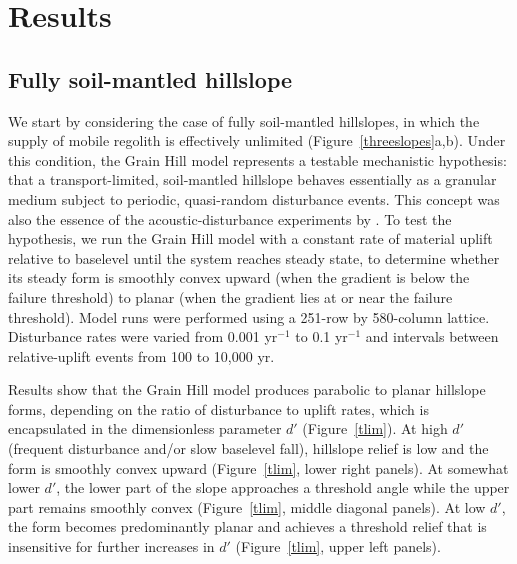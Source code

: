 \documentclass[esurf, manuscript]{copernicus}
\begin{document}
\section{Results}

\subsection{Fully soil-mantled hillslope}

We start by considering the case of fully soil-mantled hillslopes, in which the supply of mobile regolith is effectively unlimited (Figure~\ref{threeslopes}a,b). Under this condition, the Grain Hill model represents a testable mechanistic hypothesis: that a transport-limited, soil-mantled hillslope behaves essentially as a granular medium subject to periodic, quasi-random disturbance events. This concept was also the essence of the acoustic-disturbance experiments by \citet{roering2001hillslope}. To test the hypothesis, we run the Grain Hill model with a constant rate of material uplift relative to baselevel until the system reaches steady state, to determine whether its steady form is smoothly convex upward (when the gradient is below the failure threshold) to planar (when the gradient lies at or near the failure threshold). Model runs were performed using a 251-row by 580-column lattice. Disturbance rates were varied from 0.001 yr$^{-1}$ to 0.1 yr$^{-1}$ and intervals between relative-uplift events from 100 to 10,000 yr.  

Results show that the Grain Hill model produces parabolic to planar hillslope forms, depending on the ratio of disturbance to uplift rates, which is encapsulated in the dimensionless parameter $d'$ (Figure~\ref{tlim}). At high $d'$ (frequent disturbance and/or slow baselevel fall), hillslope relief is low and the form is smoothly convex upward (Figure~\ref{tlim}, lower right panels). At somewhat lower $d'$, the lower part of the slope approaches a threshold angle while the upper part remains smoothly convex (Figure~\ref{tlim}, middle diagonal panels). At low $d'$, the form becomes predominantly planar and achieves a threshold relief that is insensitive for further increases in $d'$ (Figure~\ref{tlim}, upper left panels).
\end{document}
